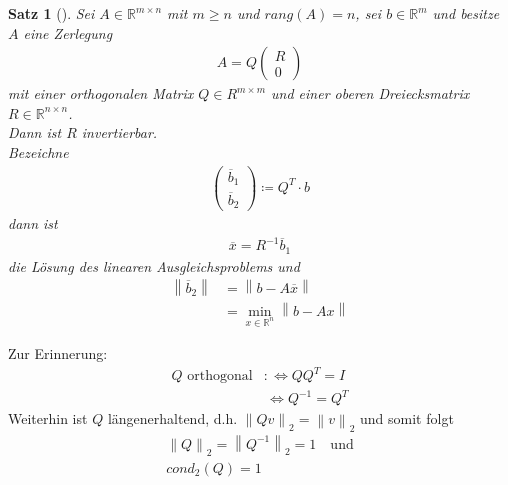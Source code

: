 \documentclass[ngerman,fontsize=11pt, paper=a4, parskip=half, titlepage=true, toc=bib]{scrbook}
\theoremstyle{definition}
\theoremstyle{plain}
\newtheorem{Satz}[Def]{Satz}		%
\newcommand{\R}{\mathds{R}}
\newcommand{\Ren}{\mathds{R}^{n}}
\newcommand{\nn}[1]{\left\| #1 \right\|}
\newcommand{\subsectione}[1]{\addtocounter{Def}{1}\subsection{#1}}
\newenvironment{Satze}[1][]{ %
  \begin{Satz}[#1]
  }
  {
  \end{Satz}
  \addtocounter{subsection}{1}
}
\begin{document}
\begin{Satze}
  Sei $A\in \R^{m\times n} $ mit $m\geq n$ und $rang(A) = n$,
  sei $b\in\R^m$ und besitze $A$ eine Zerlegung
  \begin{gather*}
    A= Q\begin{pmatrix}R\\0\end{pmatrix}
  \end{gather*}
  mit einer orthogonalen Matrix $Q\in R^{m\times m}$ und 
  einer oberen Dreiecksmatrix $R\in \R^{n\times n}$. \\
  Dann ist $R$ invertierbar. \\
  Bezeichne 
  \begin{gather}
    \begin{pmatrix} \overline{b}_1 \\ \overline{b}_2\end{pmatrix}
    \coloneqq Q^T\cdot b
    \label{IV.3.9}
  \end{gather}
  dann ist
  \begin{gather}
    \overline{x} = R^{-1} \overline{b}_1 
    \label{IV.3.10}
  \end{gather}
  die Lösung des linearen Ausgleichsproblems und
  \begin{align*}
    \nn{\overline{b}_2} &= \nn{b-A\overline{x}} \\
                        & = \min_{x\in \Ren }\nn{b-Ax}
  \end{align*}
\end{Satze}

Zur Erinnerung:
\begin{align*}
  Q \text{ orthogonal} &:\Leftrightarrow QQ^T = I \\
                       &\, \Leftrightarrow Q^{-1} = Q^T
\end{align*}
Weiterhin ist $Q$ längenerhaltend, d.h. $\nn{Qv}_2 = \nn{v}_2$ 
und somit folgt
\begin{gather}
  \nonumber
  \nn{Q}_2 = \nn{Q^{-1}}_2 = 1 \quad \text{und} \\
  cond_2(Q) = 1
  \label{IV.3.11}
\end{gather}
\end{document}
